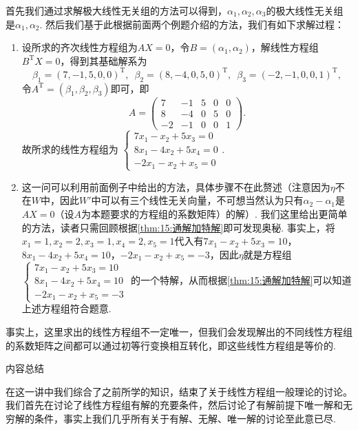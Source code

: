 \begin{solution}
    首先我们通过求解极大线性无关组的方法可以得到，$\alpha_1,\alpha_2,\alpha_3$的极大线性无关组是$\alpha_1,\alpha_2$. 然后我们基于此根据前面两个例题介绍的方法，我们有如下求解过程：
    \begin{enumerate}
        \item 设所求的齐次线性方程组为$AX=0$，令$B=(\alpha_1,\alpha_2)$，解线性方程组$B^\mathrm{T}X=0$，得到其基础解系为
        \[\beta_1=(7,-1,5,0,0)^\mathrm{T},\enspace\beta_2=(8,-4,0,5,0)^\mathrm{T},\enspace\beta_3=(-2,-1,0,0,1)^\mathrm{T},\]
        令$A^\mathrm{T}=(\beta_1,\beta_2,\beta_3)$即可，即
        \[A=\begin{pmatrix}
                7 & -1 & 5 & 0 & 0 \\ 8 & -4 & 0 & 5 & 0 \\ -2 & -1 & 0 & 0 & 1
            \end{pmatrix}.\]
        故所求的线性方程组为
        $\begin{cases}
                7x_1-x_2+5x_3=0 \\ 8x_1-4x_2+5x_4=0 \\ -2x_1-x_2+x_5=0
            \end{cases}.$

        \item 这一问可以利用前面例子中给出的方法，具体步骤不在此赘述（注意因为$\eta$不在$W$中，因此$W'$中可以有三个线性无关向量，不可想当然认为只有$\alpha_2-\alpha_1$是$AX=0$（设$A$为本题要求的方程组的系数矩阵）的解）. 我们这里给出更简单的方法，读者只需回顾根据\autoref{thm:15:通解加特解}即可发现奥秘. 事实上，将$x_1=1,x_2=2,x_3=1,x_4=2,x_5=1$代入有$7x_1-x_2+5x_3=10$，$8x_1-4x_2+5x_4=10$，$-2x_1-x_2+x_5=-3$，因此$\eta$就是方程组
        $\begin{cases}
                7x_1-x_2+5x_3=10 \\ 8x_1-4x_2+5x_4=10 \\ -2x_1-x_2+x_5=-3
            \end{cases}$
        的一个特解，从而根据\autoref{thm:15:通解加特解}可以知道上述方程组符合题意.
    \end{enumerate}
\end{solution}

事实上，这里求出的线性方程组不一定唯一，但我们会发现解出的不同线性方程组的系数矩阵之间都可以通过初等行变换相互转化，即这些线性方程组是等价的.

\vspace{2ex}
\centerline{\heiti \Large 内容总结}
在这一讲中我们综合了之前所学的知识，结束了关于线性方程组一般理论的讨论。我们首先在讨论了线性方程组有解的充要条件，然后讨论了有解前提下唯一解和无穷解的条件，事实上我们几乎所有关于有解、无解、唯一解的讨论至此意已尽.

